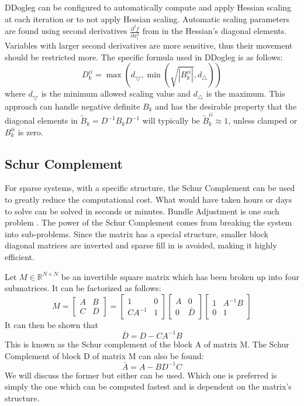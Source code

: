 \documentclass[peerreview,compsoc,onecolumn]{IEEEtran}
\newcommand{\R}{\mathbb{R}}
\begin{document}
DDogleg can be configured to automatically compute and apply Hessian scaling at each iteration or to not apply Hessian scaling. Automatic scaling parameters are found using second derivatives $\frac{\partial^2 f}{\partial x^2_i}$ from in the Hessian's diagonal elements. Variables with larger second derivatives are more sensitive, thus their movement should be restricted more. The specific formula used in DDogleg is as follows:
\begin{equation}
D_k^{ii} = \max\left( d_{\bigtriangledown},\min\left( \sqrt{|B_k^{ii}|} , d_{\bigtriangleup} \right)\right)
\end{equation}
where $d_{\bigtriangledown}$ is the minimum allowed scaling value and $d_{\bigtriangleup}$ is the maximum. This approach can handle negative definite $B_k$ and has the desirable property \cite{dennis1996} that the diagonal elements in $\tilde{B}_k = D^{-1}B_k D^{-1}$ will typically be $\tilde{B}_k^{ii} \approx 1$, unless clamped or $B_k^{ii}$ is zero. 

\subsection{Schur Complement}
For sparse systems, with a specific structure, the Schur Complement can be used to greatly reduce the computational cost. What would have taken hours or days to solve can be solved in seconds or minutes. Bundle Adjustment is one such problem \cite{triggs1999bundle}. The power of the Schur Complement comes from breaking the system into sub-problems. Since the matrix has a special structure, smaller block diagonal matrices are inverted and sparse fill in \cite{davis2006} is avoided, making it highly efficient.

Let $M \in \R^{N \times N}$ be an invertible square matrix which has been broken up into four submatrices. It can be factorized as follows:
\begin{equation}
M = \begin{bmatrix}
A & B \\
C & D
\end{bmatrix}
=
\begin{bmatrix}
1 & 0 \\
C A^{-1} & 1
\end{bmatrix}
\begin{bmatrix}
A & 0 \\
0 & \bar{D}
\end{bmatrix}
\begin{bmatrix}
1 & A^{-1}B \\
0 & 1
\end{bmatrix}
\end{equation}
It can then be shown that
\begin{equation}
\bar{D} = D - C A^{-1}B
\end{equation}
This is known as the Schur complement of the block A of matrix M. The Schur Complement of block D of matrix M can also be found:
\begin{equation}
\bar{A} = A - B D^{-1}C
\end{equation}
We will discuss the former but either can be used. Which one is preferred is simply the one which can be computed fastest and is dependent on the matrix's structure.
\end{document}
